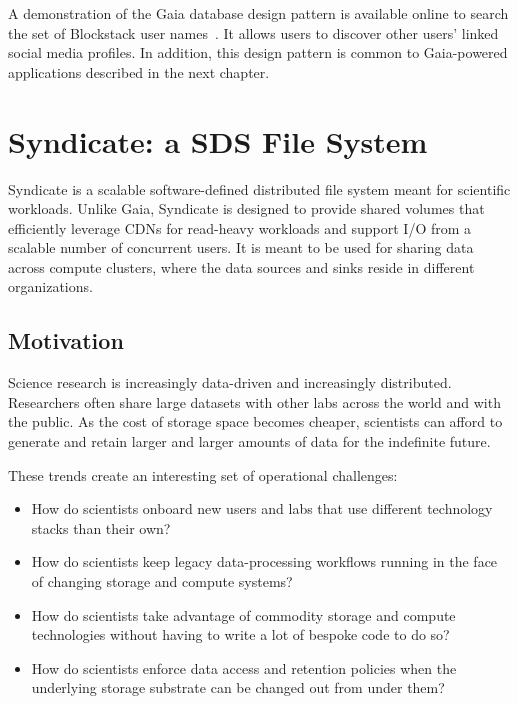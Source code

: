 A demonstration of the Gaia database design pattern is available online to search the
set of Blockstack user names~\cite{blockstack-explorer}.  It allows users to
discover other users' linked social media profiles.  In addition, this design
pattern is common to Gaia-powered applications described in the next chapter.

\section{Syndicate: a SDS File System}

Syndicate is a scalable software-defined distributed file system meant for scientific
workloads.  Unlike Gaia, Syndicate is designed to provide shared volumes that
efficiently leverage CDNs for read-heavy workloads and 
support I/O from a scalable number of concurrent users.  It is meant to be
used for sharing data across compute clusters, where the data sources and
sinks reside in different organizations.

\subsection{Motivation}

Science research is increasingly data-driven and increasingly distributed.
Researchers often share large datasets with other labs across the world and 
with the public.  As the cost of storage space becomes cheaper, scientists can
afford to generate and retain larger and larger amounts of data for the
indefinite future.

These trends create an interesting set of operational challenges:

\begin{itemize}
   \item How do scientists onboard new users and labs that use different
      technology stacks than their own?
   \item How do scientists keep legacy data-processing workflows running in the face
      of changing storage and compute systems?
   \item How do scientists take advantage of commodity storage and
      compute technologies without having to write a lot of bespoke code
      to do so?
   \item How do scientists enforce data access and retention policies when the
      underlying storage substrate can be changed out from under them?
\end{itemize}

